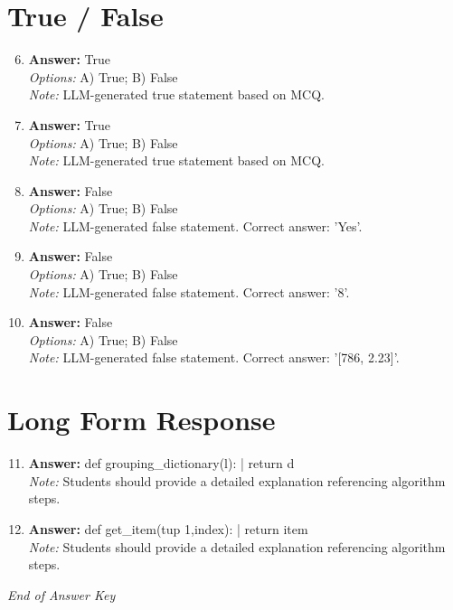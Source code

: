 \documentclass[12pt]{article}
\begin{document}
\section*{True / False}
\begin{enumerate}[label=\arabic*.]
\setcounter{enumi}{5}
\item \textbf{Answer:} True
\\ \textit{Options:} A) True; B) False
\\ \textit{Note:} LLM-generated true statement based on MCQ.
\item \textbf{Answer:} True
\\ \textit{Options:} A) True; B) False
\\ \textit{Note:} LLM-generated true statement based on MCQ.
\item \textbf{Answer:} False
\\ \textit{Options:} A) True; B) False
\\ \textit{Note:} LLM-generated false statement. Correct answer: 'Yes'.
\item \textbf{Answer:} False
\\ \textit{Options:} A) True; B) False
\\ \textit{Note:} LLM-generated false statement. Correct answer: '8'.
\item \textbf{Answer:} False
\\ \textit{Options:} A) True; B) False
\\ \textit{Note:} LLM-generated false statement. Correct answer: '[786, 2.23]'.
\end{enumerate}

\section*{Long Form Response}
\begin{enumerate}[label=\arabic*.]
\setcounter{enumi}{10}
\item \textbf{Answer:} def grouping\_dictionary(l): | return d
\\ \textit{Note:} Students should provide a detailed explanation referencing algorithm steps.
\item \textbf{Answer:} def get\_item(tup 1,index): | return item
\\ \textit{Note:} Students should provide a detailed explanation referencing algorithm steps.
\end{enumerate}

\vfill
\noindent\textit{End of Answer Key}
\end{document}
